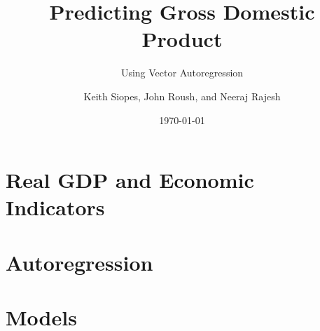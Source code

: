 \documentclass[aspectratio=169]{beamer}
\title{Predicting Gross Domestic Product}
\subtitle{Using Vector Autoregression}
\date{\today}
\author{Keith Siopes, John Roush, and Neeraj Rajesh}
\institute{Central Michigan University}
\begin{document}
    
    \maketitle

    \section{Real GDP and Economic Indicators}
    

    \section{Autoregression}
    
    
    \section{Models}
    
\end{document}
